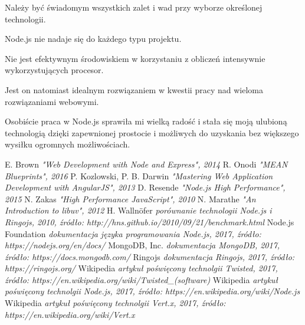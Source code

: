 \documentclass[12pt]{report}
\begin{document}
Należy być świadomym wszystkich zalet i wad przy wyborze określonej technologii.

Node.js nie nadaje się do każdego typu projektu.

Nie jest efektywnym środowiskiem w korzystaniu z obliczeń intensywnie wykorzystujących procesor.

Jest on natomiast idealnym rozwiązaniem w kwestii pracy nad wieloma rozwiązaniami webowymi.

Osobiście praca w Node.js sprawiła mi wielką radość i stała się moją ulubioną technologią dzięki zapewnionej prostocie i możliwych do uzyskania bez większego wysiłku ogromnych możliwościach.

\begin{thebibliography}{99}
E.
Brown
\textit{"Web Development with Node and Express", 2014}
R.
Onodi
\textit{"MEAN Blueprints", 2016}
P.
Kozlowski, P.
B.
Darwin
\textit{"Mastering Web Application Development with AngularJS", 2013}
D.
Resende 
\textit{"Node.js High Performance", 2015}
N.
Zakas
\textit{"High Performance JavaScript", 2010}
N.
Marathe
\textit{"An Introduction to libuv", 2012}
H.
Wallnöfer
\textit{porównanie technologii Node.js i Ringojs, 2010, źródło: http://hns.github.io/2010/09/21/benchmark.html}
Node.js Foundation
\textit{dokumentacja języka programowania Node.js, 2017, źródło: https://nodejs.org/en/docs/}
MongoDB, Inc.
\textit{dokumentacja MongoDB, 2017, źródło: https://docs.mongodb.com/}
Ringojs
\textit{dokumentacja Ringojs, 2017, źródło: https://ringojs.org/}
Wikipedia
\textit{artykuł poświęcony technolgii Twisted, 2017, źródło: https://en.wikipedia.org/wiki/Twisted\_(software)}
Wikipedia
\textit{artykuł poświęcony technolgii Node.js, 2017, źródło: https://en.wikipedia.org/wiki/Node.js}
Wikipedia
\textit{artykuł poświęcony technolgii Vert.x, 2017, źródło: https://en.wikipedia.org/wiki/Vert.x}
\end{thebibliography}
\listoffigures
\end{document}
